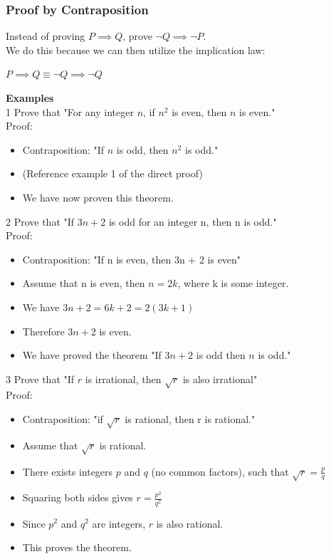\documentclass[12pt, letterpaper]{article}
\newcommand{\exheader}[1][ex]{{\tiny{#1}\normalsize}}
\begin{document}
\subsubsection{Proof by Contraposition}
Instead of proving $P \implies Q$, prove $\neg Q \implies \neg P$. \\
We do this because we can then utilize the implication law: 
\begin{center}
	$P \implies Q \equiv \neg Q \implies \neg Q$
\end{center}
\bigbreak
\textbf{Examples} \\
\exheader[1] Prove that "For any integer $n$, if $n^2$ is even, then $n$ is even." \\ Proof:
\vspace*{-0.25cm}
\begin{itemize}[leftmargin=*, label={}]
	\item Contraposition: "If $n$ is odd, then $n^2$ is odd."
	\item (Reference example 1 of the direct proof)
	\item We have now proven this theorem.
\end{itemize}

\bigbreak

\exheader[2] Prove that "If $3n + 2$ is odd for an integer n, then n is odd." \\ Proof:
\vspace*{-0.25cm}
\begin{itemize}[leftmargin=*, label={}]
	\item Contraposition: "If n is even, then 3n + 2 is even"
	\item Assume that n is even, then $n = 2k$, where k is some integer.
	\item We have $3n + 2 = 6k + 2 = 2(3k+1)$
	\item Therefore $3n + 2$ is even.
	\item We have proved the theorem "If $3n + 2$ is odd then $n$ is odd."
\end{itemize}

\bigbreak

\exheader[3] Prove that "If $r$ is irrational, then $\sqrt{r}$ is also irrational" \\ Proof:
\vspace*{-0.25cm}
\begin{itemize}[leftmargin=*, label={}]
	\item Contraposition: "if $\sqrt{r}$ is rational, then r is rational."
	\item Assume that $\sqrt{r}$ is rational.
	\item There exists integers $p$ and $q$ (no common factors), such that $\sqrt{r} = \frac{p}{q}$
	\item Squaring both sides gives $r = \frac{p^2}{q^2}$
	\item Since $p^2$ and $q^2$ are integers, $r$ is also rational.
	\item This proves the theorem.
\end{itemize}
\end{document}
